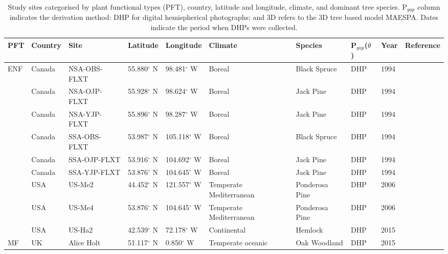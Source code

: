 \documentclass[a4paper,11pt]{report}
\begin{document}
\begin{sidewaystable}
\caption{Study sites categorised by plant functional types (PFT), country, latitude and longitude, climate, and dominant tree species. P$_{gap}$ column indicates the derivation method: DHP for digital hemispherical photographs; and 3D refers to the 3D tree based model MAESPA. Dates indicate the period when DHPs were collected. }
\begin{tabular}{p{1.0cm} p{1.5cm} p{2.1cm} p{2.1cm} p{2.1cm} p{2.1cm} p{2.1cm} p{2.5cm} p{1.0cm} p{2.1cm}}
\hline
\hline   
\bf PFT & \bf Country & \bf Site & \bf Latitude & \bf Longitude & \bf Climate & \bf Species & \bf P$_{gap}$($\theta$) & \bf Year & \bf Reference\\
 \hline
\multirow{9}{*}{ENF} 
     & Canada &  NSA-OBS-FLXT &   55.880$^{\circ}$ N & 98.481$^{\circ}$ W & Boreal & Black Spruce & DHP & 1994 & \citet{Sellers1997}\\
     & Canada &  NSA-OJP-FLXT &   55.928$^{\circ}$ N & 98.624$^{\circ}$ W & Boreal & Jack Pine    & DHP & 1994 & \citet{Sellers1997}\\
     & Canada &  NSA-YJP-FLXT &   55.896$^{\circ}$ N & 98.287$^{\circ}$ W & Boreal & Jack Pine & DHP & 1994 & \citet{Sellers1997}\\
     & Canada &  SSA-OBS-FLXT &   53.987$^{\circ}$ N & 105.118$^{\circ}$ W & Boreal & Black Spruce & DHP & 1994 & \citet{Sellers1997}\\
     & Canada &  SSA-OJP-FLXT &   53.916$^{\circ}$ N & 104.692$^{\circ}$ W & Boreal & Jack Pine & DHP & 1994 & \citet{Sellers1997}\\
     & Canada &  SSA-YJP-FLXT &   53.876$^{\circ}$ N & 104.645$^{\circ}$ W & Boreal & Jack Pine & DHP & 1994 & \citet{Sellers1997}\\
     & USA    &  US-Me2       &   44.452$^{\circ}$ N & 121.557$^{\circ}$ W & Temperate Mediterranean & Ponderosa Pine & DHP & 2006 & \citet{DeKauwe2011,Thomas2009}\\
     & USA    &  US-Me4       &   53.876$^{\circ}$ N & 104.645$^{\circ}$ W & Temperate Mediterranean & Ponderosa Pine & DHP & 2006 & \citet{DeKauwe2011,Law2001}\\
     & USA    &  US-Ha2       &   42.539$^{\circ}$ N & 72.178$^{\circ}$ W  & Continental & Hemlock & DHP & 2015 & \citet{Hadley2002}\\
\hline
\multirow{1}{*}{MF} 
     & UK   &  Alice Holt   &   51.117$^{\circ}$ N & 0.850$^{\circ}$ W & Temperate oceanic & Oak Woodland & DHP & 2015 & \citet{Wilkinson2012}\\

\end{tabular}
\end{sidewaystable}
\end{document}
